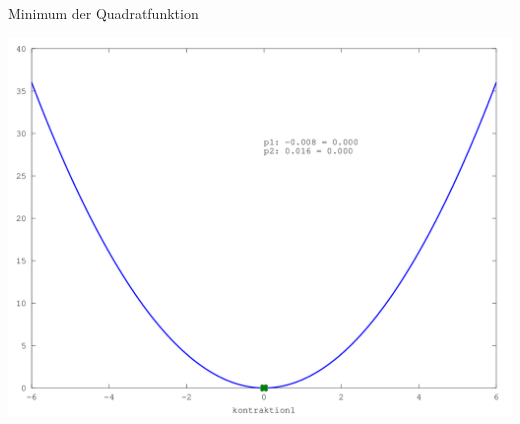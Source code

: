 \documentclass[\outputformat]{beamer}
\begin{document}
\begin{frame}{Minimum der Quadratfunktion}
	\begin{center}
		\includegraphics[height=0.75\paperheight]{../bilder/Quadrat/sinx_x010.png}
	\end{center}
\end{frame}
\end{document}
